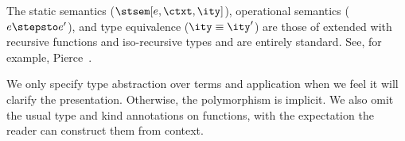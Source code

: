 The static semantics ($\stsem[e,\ctxt,\ity]$), operational
semantics ($e \stepsto e'$), and type 
equivalence ($\ity \equiv \ity'$) are those of \fomega{} extended with
recursive functions and iso-recursive types and are entirely standard.
See, for example, Pierce~\cite{pierce:tapl}.

We only specify type
abstraction over terms and application when we feel it will clarify
the presentation. Otherwise, the polymorphism is implicit.  We also
omit the usual type and kind annotations on functions, with the
expectation the reader can construct them from context.  



